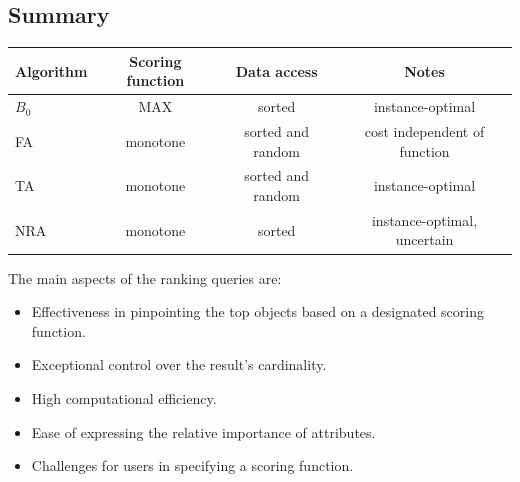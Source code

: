 \subsection{Summary}
\begin{table}[H]
    \centering
    \begin{tabular}{l|ccc}
    \multicolumn{1}{c|}{\textbf{Algorithm}} & \textbf{Scoring function} & \textbf{Data access} & \textbf{Notes}                       \\ \hline
    $B_0$                                   & MAX                       & sorted               & instance-optimal                     \\
    FA                                      & monotone                  & sorted and random    & cost independent of function         \\
    TA                                      & monotone                  & sorted and random    & instance-optimal                     \\
    NRA                                     & monotone                  & sorted               & instance-optimal, uncertain         
    \end{tabular}
\end{table}

The main aspects of the ranking queries are: 
\begin{itemize}
    \item Effectiveness in pinpointing the top objects based on a designated scoring function.
    \item Exceptional control over the result's cardinality.
    \item High computational efficiency.
    \item Ease of expressing the relative importance of attributes.
    \item Challenges for users in specifying a scoring function.
\end{itemize}